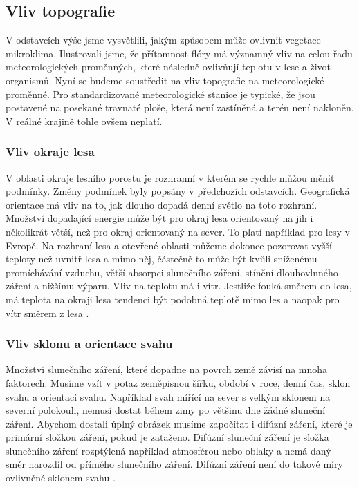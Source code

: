 \subsection{Vliv topografie} \label{chap:topo}
V odstavcích výše jsme vysvětlili, jakým způsobem může ovlivnit vegetace mikroklima. Ilustrovali jsme, že přítomnost flóry má významný vliv na celou řadu meteorologických proměnných, které následně ovlivňují teplotu v lese a život organismů. Nyní se budeme soustředit na vliv topografie na meteorologické proměnné. Pro standardizované meteorologické stanice je typické, že jsou postavené na posekané travnaté ploše, která není zastíněná a terén není nakloněn. V reálné krajině tohle ovšem neplatí.

\subsubsection{Vliv okraje lesa}
V oblasti okraje lesního porostu je rozhranní v kterém se rychle můžou měnit podmínky. Změny podmínek byly popsány v předchozích odstavcích. Geografická orientace má vliv na to, jak dlouho dopadá denní světlo na toto rozhraní. Množství dopadající energie může být pro okraj lesa orientovaný na jih i několikrát větší, než pro okraj orientovaný na sever. To platí například pro lesy v Evropě. Na rozhraní lesa a otevřené oblasti můžeme dokonce pozorovat vyšší teploty než uvnitř lesa a mimo něj, částečně to může být kvůli sníženému promíchávání vzduchu, větší absorpci slunečního záření, stínění dlouhovlnného záření a nižšímu výparu. Vliv na teplotu má i vítr. Jestliže fouká směrem do lesa, má teplota na okraji lesa tendenci být podobná teplotě mimo les a naopak pro vítr směrem z lesa \parencite{alma}.

\subsubsection{Vliv sklonu a orientace svahu}
Množství slunečního záření, které dopadne na povrch země závisí na mnoha faktorech. Musíme vzít v potaz zeměpisnou šířku, období v roce, denní čas, sklon svahu a orientaci svahu. Například svah mířící na sever s velkým sklonem na severní polokouli, nemusí dostat během zimy po většinu dne žádné sluneční záření. Abychom dostali úplný obrázek musíme započítat i difúzní záření, které je primární složkou záření, pokud je zataženo. Difúzní sluneční záření je složka slunečního záření rozptýlená například atmosférou nebo oblaky a nemá daný směr narozdíl od přímého slunečního záření. Difúzní záření není do takové míry ovlivněné sklonem svahu \parencite{alma}.

